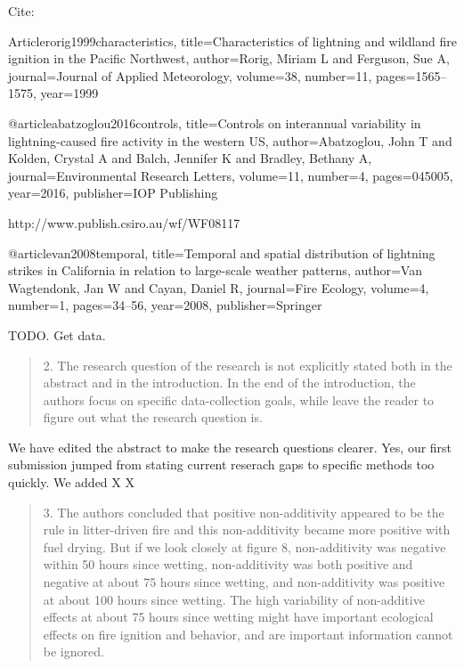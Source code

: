 \documentclass[letterpaper, 12pt]{letter}
\begin{document}
\begin{letter}{}
Cite:

Article{rorig1999characteristics,
  title={Characteristics of lightning and wildland fire ignition in the Pacific Northwest},
  author={Rorig, Miriam L and Ferguson, Sue A},
  journal={Journal of Applied Meteorology},
  volume={38},
  number={11},
  pages={1565--1575},
  year={1999}
}


@article{abatzoglou2016controls,
  title={Controls on interannual variability in lightning-caused fire activity in the western US},
  author={Abatzoglou, John T and Kolden, Crystal A and Balch, Jennifer K and Bradley, Bethany A},
  journal={Environmental Research Letters},
  volume={11},
  number={4},
  pages={045005},
  year={2016},
  publisher={IOP Publishing}
}

http://www.publish.csiro.au/wf/WF08117

@article{van2008temporal,
  title={Temporal and spatial distribution of lightning strikes in California in relation to large-scale weather patterns},
  author={Van Wagtendonk, Jan W and Cayan, Daniel R},
  journal={Fire Ecology},
  volume={4},
  number={1},
  pages={34--56},
  year={2008},
  publisher={Springer}
}




TODO.  Get data.


\begin{quote}
2. The research question of the research is not explicitly stated both in the abstract and in the introduction. In the end of the introduction, the authors focus on specific data-collection goals, while leave the reader to figure out what the research question is. 
\end{quote}

We have edited the abstract to make the research questions clearer. Yes, our first submission jumped from stating current reserach gaps to specific methods too quickly.  We added X X


\begin{quote}
3. The authors concluded that positive non-additivity appeared to be the rule in litter-driven fire and this non-additivity became more positive with fuel drying. But if we look closely at figure 8, non-additivity was negative within 50 hours since wetting, non-additivity was both positive and negative at about 75 hours since wetting, and non-additivity was positive at about 100 hours since wetting. The high variability of non-additive effects at about 75 hours since wetting might have important ecological effects on fire ignition and behavior, and are important information cannot be ignored.
\end{quote}


\end{letter}
\end{document}

